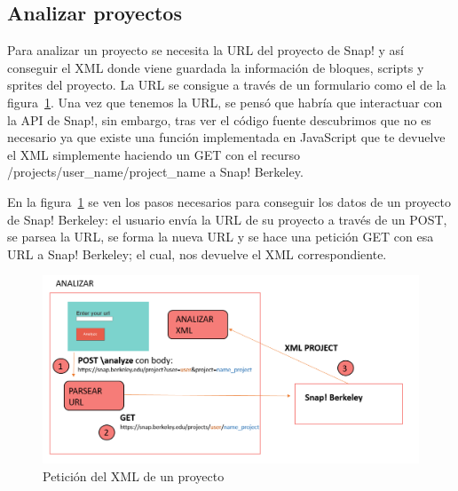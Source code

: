 \documentclass[a4paper, 12pt]{book}
\begin{document}
\subsection{Analizar proyectos}
Para analizar un proyecto se necesita la URL del proyecto de Snap! y así conseguir el XML donde viene guardada la información de bloques, scripts y sprites del proyecto. La URL se consigue a través de un formulario como el de la figura~\ref{figura:xml}. Una vez que tenemos la URL, se pensó que habría que interactuar con la API de Snap!, sin embargo, tras ver el código fuente descubrimos que no es necesario ya que existe una función implementada en JavaScript que te devuelve el XML simplemente haciendo un GET con el recurso /projects/user\_name/project\_name a Snap! Berkeley. 

En la figura~\ref{figura:xml} se ven los pasos necesarios para conseguir los datos de un proyecto de Snap! Berkeley: el usuario envía la URL de su proyecto a través de un POST, se parsea la URL, se forma la nueva URL y se hace una petición GET con esa URL a Snap! Berkeley; el cual, nos devuelve el XML correspondiente.

  \begin{figure}[h]
            \centering
            \includegraphics[scale=0.55]{img/analizar.PNG}
            \caption{Petición del XML de un proyecto}
            \label{figura:xml}
    \end{figure}
        
\end{document}
